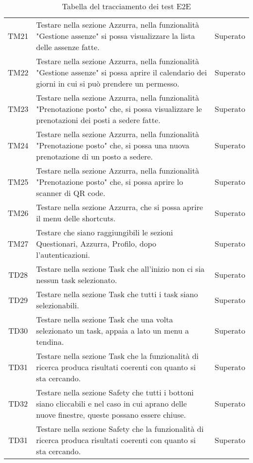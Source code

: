 \begin{table}[h]%
	\centering
	\begin{tabularx}{\textwidth}{c X c}
		\hline	
		\rowcolor{giallo}
		\intest{Codice} &  \intest{Descrizione} & \intest{Esito}\\	
		\hline	
		TM21 & Testare nella sezione Azzurra, nella funzionalità "Gestione assenze" si possa visualizzare la lista delle assenze fatte. & Superato\\
		TM22 & Testare nella sezione Azzurra, nella funzionalità "Gestione assenze" si possa aprire il calendario dei giorni in cui si può prendere un permesso. & Superato\\
		TM23 & Testare nella sezione Azzurra, nella funzionalità "Prenotazione posto" che, si possa visualizzare le prenotazioni dei posti a sedere fatte. & Superato\\
		TM24 & Testare nella sezione Azzurra, nella funzionalità "Prenotazione posto" che, si possa una nuova prenotazione di un posto a sedere. & Superato\\
		TM25 & Testare nella sezione Azzurra, nella funzionalità "Prenotazione posto" che, si possa aprire lo scanner di \gls{QR code}\ap{[g]}. & Superato\\
		TM26 & Testare nella sezione Azzurra, che si possa aprire il menu delle shortcuts. & Superato\\
		TM27 & Testare che siano raggiungibili le sezioni Questionari, Azzurra, Profilo, dopo l'autenticazioni. & Superato \\
		TD28 & Testare nella sezione Task che all'inizio non ci sia nessun task selezionato. & Superato \\
		TD29 & Testare nella sezione Task che tutti i task siano selezionabili. & Superato \\
		TD30 & Testare nella sezione Task che una volta selezionato un task, appaia a lato un menu a tendina. & Superato \\
		TD31 & Testare nella sezione Task che la funzionalità di ricerca produca risultati coerenti con quanto si sta cercando. & Superato \\
		TD32 & Testare nella sezione Safety che tutti i bottoni siano cliccabili e nel caso in cui aprano delle nuove finestre, queste possano essere chiuse. & Superato \\
		TD31 & Testare nella sezione Safety che la funzionalità di ricerca produca risultati coerenti con quanto si sta cercando. & Superato \\
		\hline
	\end{tabularx} \hbox{}
	\caption{Tabella del tracciamento dei test E2E}
\end{table}%
